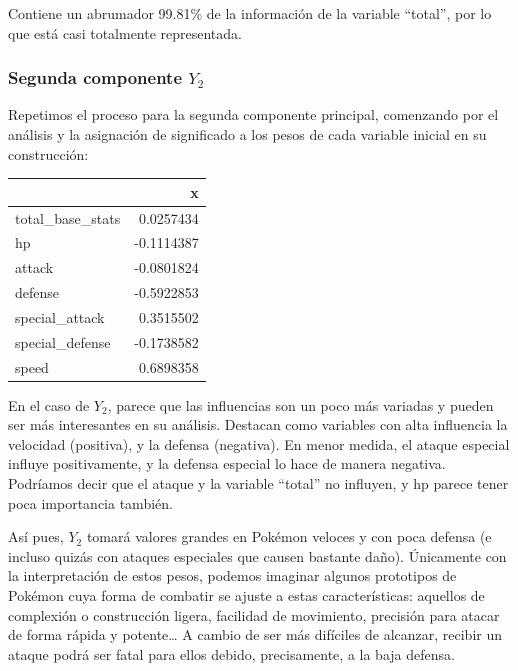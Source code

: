 \documentclass[
  11.8pt,
]{extreport}
\begin{document}
Contiene un abrumador 99.81\% de la información de la variable
``total'', por lo que está casi totalmente representada.

\subsubsection{\texorpdfstring{Segunda componente
\(Y_2\)}{Segunda componente Y\_2}}\label{segunda-componente-y_2}

Repetimos el proceso para la segunda componente principal, comenzando
por el análisis y la asignación de significado a los pesos de cada
variable inicial en su construcción:

\begin{table}[H]
\centering\begingroup\fontsize{10.5}{12.5}\selectfont

\begin{tabular}{lr}
\toprule
  & x\\
\midrule
total\_base\_stats & 0.0257434\\
hp & -0.1114387\\
attack & -0.0801824\\
defense & -0.5922853\\
special\_attack & 0.3515502\\
\addlinespace
special\_defense & -0.1738582\\
speed & 0.6898358\\
\bottomrule
\end{tabular}
\endgroup{}
\end{table}

En el caso de \(Y_2\), parece que las influencias son un poco más
variadas y pueden ser más interesantes en su análisis. Destacan como
variables con alta influencia la velocidad (positiva), y la defensa
(negativa). En menor medida, el ataque especial influye positivamente, y
la defensa especial lo hace de manera negativa. Podríamos decir que el
ataque y la variable ``total'' no influyen, y hp parece tener poca
importancia también.

Así pues, \(Y_2\) tomará valores grandes en Pokémon veloces y con poca
defensa (e incluso quizás con ataques especiales que causen bastante
daño). Únicamente con la interpretación de estos pesos, podemos imaginar
algunos prototipos de Pokémon cuya forma de combatir se ajuste a estas
características: aquellos de complexión o construcción ligera, facilidad
de movimiento, precisión para atacar de forma rápida y potente\ldots{} A
cambio de ser más difíciles de alcanzar, recibir un ataque podrá ser
fatal para ellos debido, precisamente, a la baja defensa.
\end{document}
